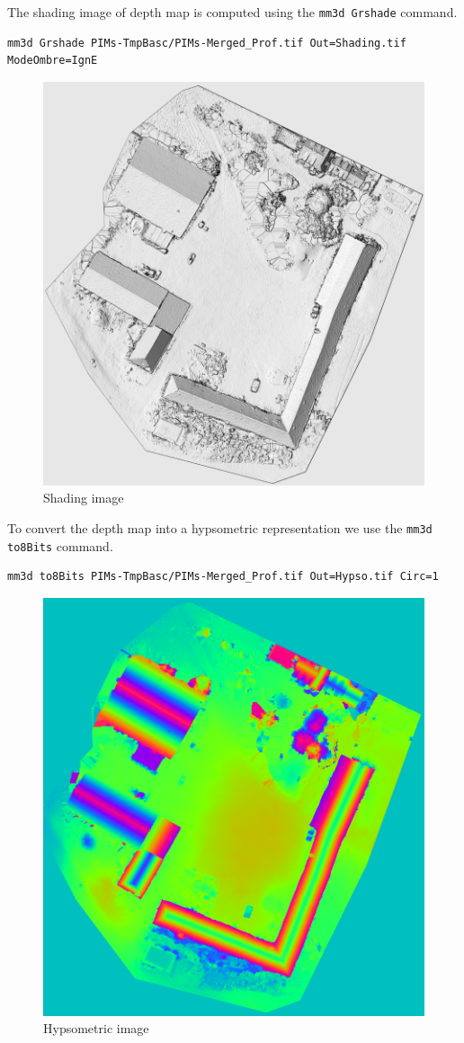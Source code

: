 The shading image of depth map is computed using the {\tt mm3d Grshade} command.
\begin{verbatim}
mm3d Grshade PIMs-TmpBasc/PIMs-Merged_Prof.tif Out=Shading.tif ModeOmbre=IgnE
\end{verbatim}

\begin{figure}[H]
    \begin{center}
    \setlength{\unitlength}{0.5cm}
    \includegraphics[width=0.4\linewidth]{FIGS/Viabon/shading.png}
    \end{center}
    \caption{Shading image}
    \label{fig:sel}
\end{figure}

To convert the depth map into a hypsometric representation we use the {\tt mm3d to8Bits} command.
\begin{verbatim}
mm3d to8Bits PIMs-TmpBasc/PIMs-Merged_Prof.tif Out=Hypso.tif Circ=1
\end{verbatim}

\begin{figure}[H]
    \begin{center}
    \setlength{\unitlength}{0.5cm}
    \includegraphics[width=0.4\linewidth]{FIGS/Viabon/hypso.png}
    \end{center}
    \caption{Hypsometric image}
    \label{fig:sel}
\end{figure}

